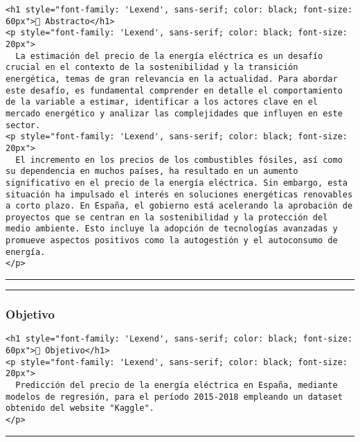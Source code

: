 \documentclass[11pt]{article}
\begin{document}
\begin{verbatim}
<h1 style="font-family: 'Lexend', sans-serif; color: black; font-size: 60px">📜 Abstracto</h1>
<p style="font-family: 'Lexend', sans-serif; color: black; font-size: 20px">
  La estimación del precio de la energía eléctrica es un desafío crucial en el contexto de la sostenibilidad y la transición energética, temas de gran relevancia en la actualidad. Para abordar este desafío, es fundamental comprender en detalle el comportamiento de la variable a estimar, identificar a los actores clave en el mercado energético y analizar las complejidades que influyen en este sector.
<p style="font-family: 'Lexend', sans-serif; color: black; font-size: 20px">
  El incremento en los precios de los combustibles fósiles, así como su dependencia en muchos países, ha resultado en un aumento significativo en el precio de la energía eléctrica. Sin embargo, esta situación ha impulsado el interés en soluciones energéticas renovables a corto plazo. En España, el gobierno está acelerando la aprobación de proyectos que se centran en la sostenibilidad y la protección del medio ambiente. Esto incluye la adopción de tecnologías avanzadas y promueve aspectos positivos como la autogestión y el autoconsumo de energía.
</p>
\end{verbatim}

\begin{center}\rule{0.5\linewidth}{0.5pt}\end{center}

    \begin{center}\rule{0.5\linewidth}{0.5pt}\end{center}

\hypertarget{objetivo}{%
\subsubsection{Objetivo}\label{objetivo}}

\begin{verbatim}
<h1 style="font-family: 'Lexend', sans-serif; color: black; font-size: 60px">🎯 Objetivo</h1>
<p style="font-family: 'Lexend', sans-serif; color: black; font-size: 20px">
  Predicción del precio de la energía eléctrica en España, mediante modelos de regresión, para el período 2015-2018 empleando un dataset obtenido del website "Kaggle".
</p>
\end{verbatim}

\begin{center}\rule{0.5\linewidth}{0.5pt}\end{center}
\end{document}
